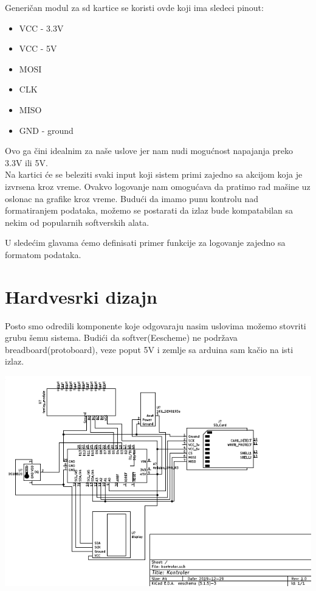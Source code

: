 \documentclass[a4paper,11pt]{book}
\begin{document}
Generičan modul za sd kartice se koristi ovde koji ima sledeci pinout:

\hrulefill
\begin{itemize}
  \item VCC - 3.3V
  \item VCC - 5V
  \item MOSI
  \item CLK 
  \item MISO
  \item GND - ground
\end{itemize}
\hrulefill

Ovo ga čini idealnim za naše uslove jer nam nudi mogućnost napajanja preko 3.3V ili 5V. \\

Na kartici će se beleziti svaki input koji sistem primi zajedno sa akcijom koja je izvrsena kroz vreme. Ovakvo logovanje nam omogućava da pratimo rad mašine uz oslonac na grafike kroz vreme. Budući da imamo punu kontrolu nad formatiranjem podataka, možemo se postarati da izlaz bude kompatabilan sa nekim od popularnih softverskih alata. 

U sledećim glavama ćemo definisati primer funkcije za logovanje zajedno sa formatom podataka.

\section{Hardvesrki dizajn}

Posto smo odredili komponente koje odgovaraju nasim uslovima možemo stovriti grubu šemu sistema. Budići da softver(Eescheme) ne podržava breadboard(protoboard), veze poput 5V i zemlje sa arduina sam kačio na isti izlaz. 

\includegraphics[width=\textwidth]{kontroler.png}
\end{document}
